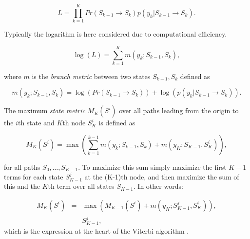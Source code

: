 \begin{equation}\label{eq:viterbiLitRev}
L = \prod_{k=1}^K Pr(S_{k-1} \rightarrow S_{k}) p(y_k | S_{k-1} \rightarrow S_{k}).
\end{equation}

Typically the \DIFdelbegin {}\DIFdelend logarithm is here considered due to computational efficiency.

\begin{equation}\label{eq:viterbiLitRev2}
\log{\left(L\right)} = \sum_{k=1}^K m(y_k ; S_{k-1}, S_{k}),
\end{equation}

where $m$ is the \emph{branch metric} between two states $S_{k-1}, S_{k}$ defined as

\begin{equation}\label{eq:viterbiLitRev3}
m(y_k ; S_{k-1}, S_{k}) = \log{\left( Pr(S_{k-1} \rightarrow S_{k}) \right)} + \log{\left( p(y_k | S_{k-1} \rightarrow S_{k}) \right)}.
\end{equation}

The maximum \emph{state metric} $M_K(S^i)$ over all paths leading from the origin to the $i$th state and $K$th node $S_K^i$ is defined as

\begin{equation}\label{eq:viterbiLitRev4}
M_K(S^i) = \max \left( \sum_{k=1}^{k-1} m(y_k ; S_{k-1}, S_{k}) + m(y_K ; S_{K-1}, S_{K}^i)\right),
\end{equation}

for all paths $S_0,\ldots, S_{K-1}$.
To maximize this sum simply maximize the first $K-1$ terms for each state $S^j_{K-1}$ at the (K-1)th node, and then maximize the sum of this and the $K$th term over all states $S_{K-1}$. In other words:

\begin{eqnarray}\label{eq:viterbiLitRev5}
M_K(S^i) &=& \max \left( M_{K-1}(S^i) + m(y_K ; S_{K-1}^j, S_{K}^i)\right), \\ \nonumber
& & S_{K-1}^j,
\end{eqnarray}
which is the expression at the heart of the Viterbi algorithm \cite{Viterbi2006}.


